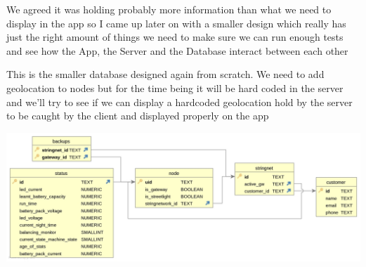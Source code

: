 \documentclass[a4paper,12pt]{article}
\begin{document}
We agreed it was holding probably more information than what we need to display in the app so I came up later on with a smaller design which really has just the right amount of things we need to make sure we can run enough tests and see how the App, the Server and the Database interact between each other
\clearpage

This is the smaller database designed again from scratch. We need to add geolocation to nodes but for the time being it will be hard coded in the server and we'll try to see if we can display a hardcoded geolocation hold by the server to be caught by the client and displayed properly on the app

\noindent \includegraphics[width=14cm]{./SecondERSchemaGen2.jpg}

\printindex
\end{document}
